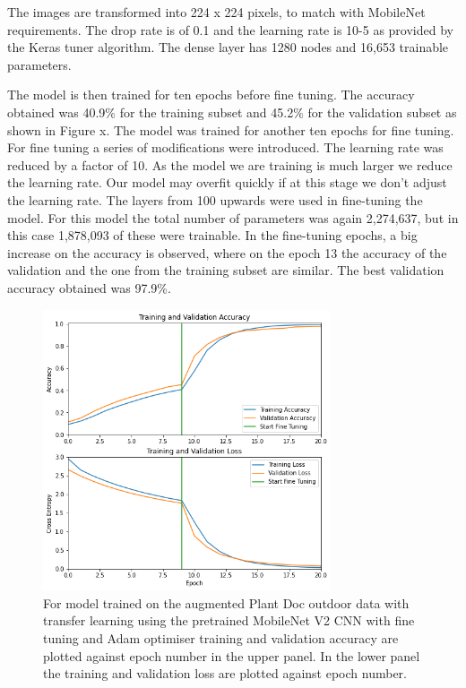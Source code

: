 \documentclass[conference]{IEEEtran}
\begin{document}
The images are transformed into 224 x 224 pixels, to match with MobileNet requirements. The drop rate is of 0.1 and the learning rate is 10-5 as provided by the Keras tuner algorithm. The dense layer has 1280 nodes and 16,653 trainable parameters. 

The model is then trained for ten epochs before fine tuning. The accuracy obtained was 40.9\% for the training subset and 45.2\% for the validation subset as shown in Figure x. The model was trained for another ten epochs for fine tuning. For fine tuning a series of modifications were introduced. The learning rate was reduced by a factor of 10. As the model we are training is much larger we reduce the learning rate. Our model may overfit quickly if at this stage we don’t adjust the learning rate. The layers from 100 upwards were used in fine-tuning the model. For this model the total number of parameters was again 2,274,637, but in this case 1,878,093 of these were trainable. In the fine-tuning epochs, a big increase on the accuracy is observed, where on the epoch 13 the accuracy of the validation and the one from the training subset are similar. The best validation accuracy obtained was 97.9\%.
\begin{figure}[htbp]
\centerline{\includegraphics[width=8.5cm]{ModelOutdoorsMobileNetEpochsAccuracychart.png}}
\caption{For model trained on the augmented Plant Doc outdoor data with transfer learning using the pretrained MobileNet V2 CNN with fine tuning and Adam optimiser training and validation accuracy are plotted against epoch number in the upper panel. In the lower panel the training and validation loss are plotted against epoch number.}
\label{fig}
\end{figure}
\end{document}
